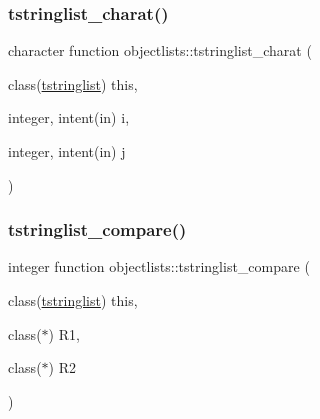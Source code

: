 \mbox{\label{namespaceobjectlists_abe1b434a57e0d690b22c8410ca9cfff0}} 
\subsubsection{\texorpdfstring{tstringlist\+\_\+charat()}{tstringlist\_charat()}}
{\footnotesize\ttfamily character function objectlists\+::tstringlist\+\_\+charat (\begin{DoxyParamCaption}\item[{class(\mbox{\hyperlink{structobjectlists_1_1tstringlist}{tstringlist}})}]{this,  }\item[{integer, intent(in)}]{i,  }\item[{integer, intent(in)}]{j }\end{DoxyParamCaption})\hspace{0.3cm}{\ttfamily [private]}}

\mbox{\label{namespaceobjectlists_a2050ccdefc2f19e1dbc8fac3a91d51d0}} 
\subsubsection{\texorpdfstring{tstringlist\+\_\+compare()}{tstringlist\_compare()}}
{\footnotesize\ttfamily integer function objectlists\+::tstringlist\+\_\+compare (\begin{DoxyParamCaption}\item[{class(\mbox{\hyperlink{structobjectlists_1_1tstringlist}{tstringlist}})}]{this,  }\item[{class($\ast$)}]{R1,  }\item[{class($\ast$)}]{R2 }\end{DoxyParamCaption})\hspace{0.3cm}{\ttfamily [private]}}

\mbox{\label{namespaceobjectlists_a926298e78fd013f34f503ab38a3bc496}} 
